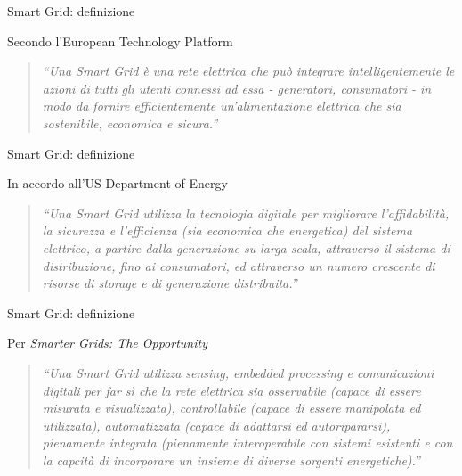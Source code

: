 \begin{frame}{Smart Grid: definizione}
\begin{block}{Secondo l’European Technology Platform}
\begin{quote}
\textit{``Una Smart Grid è una rete elettrica che può integrare intelligentemente le azioni di tutti gli utenti connessi ad essa - generatori, consumatori - in modo da fornire efficientemente un’alimentazione elettrica che sia sostenibile, economica e sicura.”}
\end{quote}
\end{block}
\end{frame}

\begin{frame}{Smart Grid: definizione}
\begin{block}{In accordo all’US Department of Energy}
\begin{quote}
\textit{``Una Smart Grid utilizza la tecnologia digitale per migliorare l’affidabilità, la sicurezza e l’efficienza (sia economica che energetica) del sistema elettrico, a partire dalla generazione su larga scala, attraverso il sistema di distribuzione, fino ai consumatori, ed attraverso un numero crescente di risorse di storage e di generazione distribuita.”}
\end{quote}
\end{block}
\end{frame}


\begin{frame}{Smart Grid: definizione}
\begin{block}{Per \textit{Smarter Grids: The Opportunity}}
\begin{quote}
\textit{``Una Smart Grid utilizza sensing, embedded processing e comunicazioni digitali per far sì che la rete elettrica sia osservabile (capace di essere misurata e visualizzata), controllabile (capace di essere manipolata ed utilizzata), automatizzata (capace di adattarsi ed autoripararsi), pienamente integrata (pienamente interoperabile con sistemi esistenti e con la capcità di incorporare un insieme di diverse sorgenti energetiche).”}
\end{quote}
\end{block}
\end{frame}

